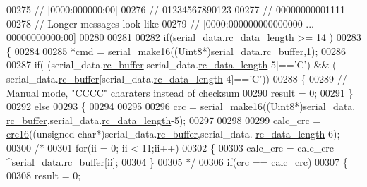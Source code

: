\begin{DoxyCode}
00275         \textcolor{comment}{// [0000:000000:00]}
00276         \textcolor{comment}{// 01234567890123}
00277         \textcolor{comment}{// 00000000001111}
00278         \textcolor{comment}{// Longer messages look like}
00279         \textcolor{comment}{// [0000:000000000000000  ... 00000000000:00]}
00280 
00281 
00282         \textcolor{keywordflow}{if}(serial\_data.\hyperlink{a00028_ab136d4fef2c523afd55b6ca74c46d7cc}{rc\_data\_length} >= 14 )
00283         \{
00284 
00285             *cmd = \hyperlink{a00028_abc17de32f14103a5be219df0d4ad9176}{serial\_make16}((\hyperlink{a00070_af84840501dec18061d18a68c162a8fa2}{Uint8}*)serial\_data.\hyperlink{a00028_ac734cb8be27f86bd99edc539434883a4}{rc\_buffer},1);
00286 
00287             \textcolor{keywordflow}{if}( (serial\_data.\hyperlink{a00028_ac734cb8be27f86bd99edc539434883a4}{rc\_buffer}[serial\_data.\hyperlink{a00028_ab136d4fef2c523afd55b6ca74c46d7cc}{rc\_data\_length}-5]==\textcolor{charliteral}{'C'}) && (
      serial\_data.\hyperlink{a00028_ac734cb8be27f86bd99edc539434883a4}{rc\_buffer}[serial\_data.\hyperlink{a00028_ab136d4fef2c523afd55b6ca74c46d7cc}{rc\_data\_length}-4]==\textcolor{charliteral}{'C'}))
00288             \{
00289                 \textcolor{comment}{// Manual mode, "CCCC" charaters instead of checksum}
00290                 result = 0;
00291             \}
00292             \textcolor{keywordflow}{else}
00293             \{
00294 
00295                 
00296                 crc  = \hyperlink{a00028_abc17de32f14103a5be219df0d4ad9176}{serial\_make16}((\hyperlink{a00070_af84840501dec18061d18a68c162a8fa2}{Uint8}*)serial\_data.
      \hyperlink{a00028_ac734cb8be27f86bd99edc539434883a4}{rc\_buffer},serial\_data.\hyperlink{a00028_ab136d4fef2c523afd55b6ca74c46d7cc}{rc\_data\_length}-5);
00297                 
00298            
00299                 calc\_crc = \hyperlink{a00019_a6553827687db2137ee550ad6e1d2f316}{crc16}((\textcolor{keywordtype}{unsigned} \textcolor{keywordtype}{char}*)serial\_data.\hyperlink{a00028_ac734cb8be27f86bd99edc539434883a4}{rc\_buffer},serial\_data.
      \hyperlink{a00028_ab136d4fef2c523afd55b6ca74c46d7cc}{rc\_data\_length}-6);
00300               \textcolor{comment}{/*}
00301 \textcolor{comment}{                for(ii = 0; ii < 11;ii++)}
00302 \textcolor{comment}{                \{}
00303 \textcolor{comment}{                    calc\_crc = calc\_crc ^serial\_data.rc\_buffer[ii];}
00304 \textcolor{comment}{                \}}
00305 \textcolor{comment}{              */}
00306                 \textcolor{keywordflow}{if}(crc == calc\_crc)
00307                 \{
00308                     result = 0;

\end{DoxyCode}
